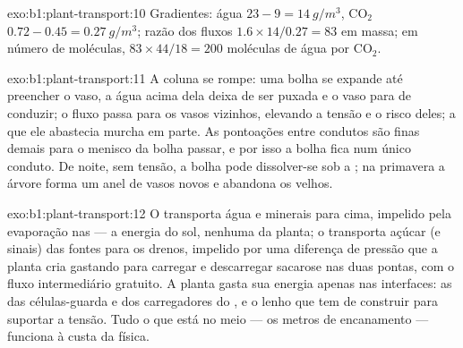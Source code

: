\begin{solution}{exo:b1:plant-transport:10}
Gradientes: água $23 - 9 = \qty{14}{g/m^3}$, $\mathrm{CO_2}$ $0.72 -
0.45 = \qty{0.27}{g/m^3}$; razão dos fluxos $1.6\times 14/0.27 = 83$ em
massa; em número de moléculas, $83\times 44/18 = 200$ moléculas de água
por $\mathrm{CO_2}$.
\end{solution}

\begin{solution}{exo:b1:plant-transport:11}
A coluna se rompe: uma bolha se expande até preencher o vaso, a água
acima dela deixa de ser puxada e o vaso para de conduzir; o fluxo
passa para os vasos vizinhos, elevando a tensão e o risco deles; a
 que ele abastecia murcha em parte. As pontoações entre condutos
são finas demais para o menisco da bolha passar, e por isso a bolha
fica num único conduto. De noite, sem tensão, a bolha pode dissolver-se
sob a ; na primavera a árvore forma um anel de vasos
novos e abandona os velhos.
\end{solution}

\begin{solution}{exo:b1:plant-transport:12}
O  transporta água e minerais para cima, impelido pela
evaporação nas  --- a energia do sol, nenhuma da planta; o 
transporta açúcar (e sinais) das fontes para os drenos, impelido por
uma diferença de pressão que a planta cria gastando  para carregar
e descarregar sacarose nas duas pontas, com o fluxo intermediário
gratuito. A planta gasta sua energia apenas nas interfaces: as  das células-guarda e dos carregadores do , e o lenho
que tem de construir para suportar a tensão. Tudo o que está no meio
--- os metros de encanamento --- funciona à custa da física.
\end{solution}

